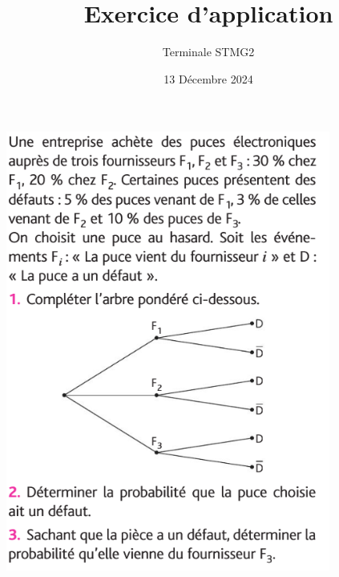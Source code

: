 \documentclass{article}
\title{Exercice d'application}
\date{13 Décembre 2024}
\author{Terminale STMG2}
\begin{document}
\maketitle
\begin{center}
\includegraphics[width=0.8\textwidth]{Exercice.png}
\end{center}
\end{document}
